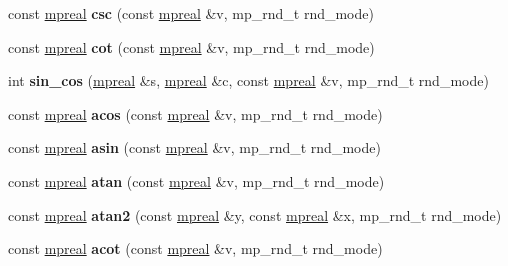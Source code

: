 \begin{DoxyCompactItemize}
const \hyperlink{classmpfr_1_1mpreal}{mpreal} {\bfseries csc} (const \hyperlink{classmpfr_1_1mpreal}{mpreal} \&v, mp\+\_\+rnd\+\_\+t rnd\+\_\+mode)
\item 
\mbox{\label{classmpfr_1_1mpreal_a88fc2bfbe4b7dfefb1dbf3f5673ea5fa}} 
const \hyperlink{classmpfr_1_1mpreal}{mpreal} {\bfseries cot} (const \hyperlink{classmpfr_1_1mpreal}{mpreal} \&v, mp\+\_\+rnd\+\_\+t rnd\+\_\+mode)
\item 
\mbox{\label{classmpfr_1_1mpreal_a1de4bf2b882f278e3ccabec09a1c020d}} 
int {\bfseries sin\+\_\+cos} (\hyperlink{classmpfr_1_1mpreal}{mpreal} \&s, \hyperlink{classmpfr_1_1mpreal}{mpreal} \&c, const \hyperlink{classmpfr_1_1mpreal}{mpreal} \&v, mp\+\_\+rnd\+\_\+t rnd\+\_\+mode)
\item 
\mbox{\label{classmpfr_1_1mpreal_a4f1a987983f60124aa3bd09772da97e8}} 
const \hyperlink{classmpfr_1_1mpreal}{mpreal} {\bfseries acos} (const \hyperlink{classmpfr_1_1mpreal}{mpreal} \&v, mp\+\_\+rnd\+\_\+t rnd\+\_\+mode)
\item 
\mbox{\label{classmpfr_1_1mpreal_a7798a5475dc4fd0c4dec9e2ee47eb1b8}} 
const \hyperlink{classmpfr_1_1mpreal}{mpreal} {\bfseries asin} (const \hyperlink{classmpfr_1_1mpreal}{mpreal} \&v, mp\+\_\+rnd\+\_\+t rnd\+\_\+mode)
\item 
\mbox{\label{classmpfr_1_1mpreal_aa19f76d7fd1eae4ddc314b9d1ab17464}} 
const \hyperlink{classmpfr_1_1mpreal}{mpreal} {\bfseries atan} (const \hyperlink{classmpfr_1_1mpreal}{mpreal} \&v, mp\+\_\+rnd\+\_\+t rnd\+\_\+mode)
\item 
\mbox{\label{classmpfr_1_1mpreal_ae6f1717d9047172d51dfbb9853cd6a7d}} 
const \hyperlink{classmpfr_1_1mpreal}{mpreal} {\bfseries atan2} (const \hyperlink{classmpfr_1_1mpreal}{mpreal} \&y, const \hyperlink{classmpfr_1_1mpreal}{mpreal} \&x, mp\+\_\+rnd\+\_\+t rnd\+\_\+mode)
\item 
\mbox{\label{classmpfr_1_1mpreal_ac4b46680524ff3879463eb04b9e7fca5}} 
const \hyperlink{classmpfr_1_1mpreal}{mpreal} {\bfseries acot} (const \hyperlink{classmpfr_1_1mpreal}{mpreal} \&v, mp\+\_\+rnd\+\_\+t rnd\+\_\+mode)
\item 

\end{DoxyCompactItemize}

